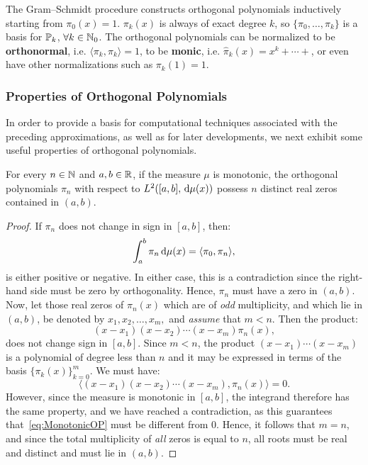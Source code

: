 \begin{remark}
The Gram--Schmidt procedure constructs orthogonal polynomials inductively starting from $\pi_0(x) = 1$. $\pi_k(x)$ is always of exact degree $k$, so $\{\pi_0,\ldots,\pi_k\}$ is a basis for $\P_k$, $\forall k\in\N_0$. The orthogonal polynomials can be normalized to be {\bf orthonormal}, i.e. $\langle\pi_k,\pi_k\rangle = 1$, to be {\bf monic}, i.e. $\hat{\pi}_k(x) = x^k + \cdots +$, or even have other normalizations such as $\pi_k(1)=1$.
\end{remark}

\subsubsection{Properties of Orthogonal Polynomials}

In order to provide a basis for computational techniques associated with the preceding approximations, as well as for later developments, we next exhibit some useful properties of orthogonal polynomials.

\begin{theorem}\label{theorem:OPzeros}
For every $n\in\N$ and $a,b\in\R$, if the measure $\mu$ is monotonic, the orthogonal polynomials $\pi_n$ with respect to $L^2([a,b],\ud\mu(x))$ possess $n$ distinct real zeros contained in $(a,b)$.
\end{theorem}
\begin{proof}
If $\pi_n$ does not change in sign in $[a,b]$, then:
\[
\int_a^b\pi_n\ud\mu(x) = \langle \pi_0,\pi_n\rangle,
\]
is either positive or negative. In either case, this is a contradiction since the right-hand side must be zero by orthogonality. Hence, $\pi_n$ must have a zero in $(a,b)$. Now, let those real zeros of $\pi_n(x)$ which are of {\em odd} multiplicity, and which lie in $(a,b)$, be denoted by $x_1, x_2,\ldots, x_m,$ and {\em assume} that $m<n$. Then the product:
\[
(x-x_1)(x-x_2)\cdots(x-x_m)\pi_n(x),
\]
does not change sign in $[a,b]$. Since $m<n$, the product $(x-x_1)\cdots(x-x_m)$ is a polynomial of degree less than $n$ and it may be expressed in terms of the basis $\{\pi_k(x)\}_{k=0}^m$. We must have:
\begin{equation}\label{eq:MonotonicOP}
\langle (x-x_1)(x-x_2)\cdots(x-x_m),\pi_n(x)\rangle = 0.
\end{equation}
However, since the measure is monotonic in $[a,b]$, the integrand therefore has the same property, and we have reached a contradiction, as this guarantees that~\eqref{eq:MonotonicOP} must be different from $0$. Hence, it follows that $m=n$, and since the total multiplicity of {\em all} zeros is equal to $n$, all roots must be real and distinct and must lie in $(a,b)$.
\end{proof}

